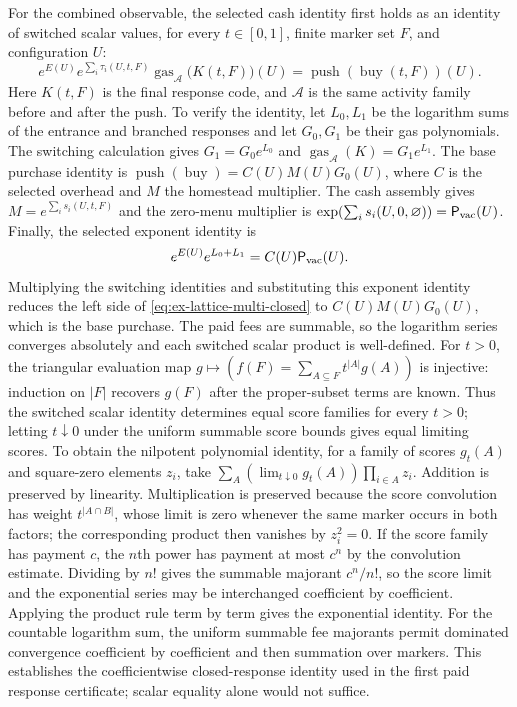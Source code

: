 For the combined observable, the selected cash identity first holds as an
identity of switched scalar values, for every $t\in[0,1]$, finite marker
set $F$, and configuration $U$:
\begin{equation}
 e^{E(U)}e^{\sum_i\tau_i(U,t,F)}
 \operatorname{gas}_{\mathcal A}\bigl(K(t,F)\bigr)(U)
 =\operatorname{push}(\operatorname{buy}(t,F))(U).
 \label{eq:ex-lattice-multi-closed}
\end{equation}
Here $K(t,F)$ is the final response code, and $\mathcal A$ is the same
activity family before and after the push. To verify the identity, let
$L_0,L_1$ be the logarithm sums of the entrance and branched responses and
let $G_0,G_1$ be their gas polynomials. The switching calculation gives
$G_1=G_0e^{L_0}$ and
$\operatorname{gas}_{\mathcal A}(K)=G_1e^{L_1}$. The base purchase identity
is $\operatorname{push}(\operatorname{buy})=C(U)M(U)G_0(U)$, where $C$
is the selected overhead and $M$ the homestead multiplier. The cash
assembly gives $M=e^{\sum_i s_i(U,t,F)}$ and the zero-menu multiplier is
$\exp(\sum_i s_i(U,0,\varnothing))=\mathsf P_{\rm vac}(U)$. Finally, the selected exponent identity is
\[
 e^{E(U)}e^{L_0+L_1}=C(U)\mathsf P_{\rm vac}(U).
\]
Multiplying the switching identities and substituting this exponent identity
reduces the left side of \eqref{eq:ex-lattice-multi-closed} to
$C(U)M(U)G_0(U)$, which is the base purchase. The paid fees are summable,
so the logarithm series converges absolutely and each switched scalar product
is well-defined. For $t>0$, the triangular evaluation map
$g\mapsto(f(F)=\sum_{A\subseteq F}t^{|A|}g(A))$ is injective: induction
on $|F|$ recovers $g(F)$ after the proper-subset terms are known. Thus the
switched scalar identity determines equal score families for every $t>0$;
letting $t\downarrow0$ under the uniform summable score bounds gives equal
limiting scores. To obtain the nilpotent polynomial identity, for a family
of scores $g_t(A)$ and square-zero elements $z_i$, take
$\sum_A(\lim_{t\downarrow0}g_t(A))\prod_{i\in A}z_i$. Addition is
preserved by linearity. Multiplication is preserved because the score
convolution has weight $t^{|A\cap B|}$, whose limit is zero whenever the
same marker occurs in both factors; the corresponding product then vanishes
by $z_i^2=0$. If the score family has payment $c$, the $n$th power has
payment at most $c^n$ by the convolution estimate. Dividing by $n!$
gives the summable majorant $c^n/n!$, so the score limit and the exponential
series may be interchanged coefficient by coefficient. Applying the product
rule term by term gives the exponential identity. For the countable logarithm sum, the uniform summable fee
majorants permit dominated convergence coefficient by coefficient and then
summation over markers. This establishes the coefficientwise closed-response
identity used in the first paid response certificate; scalar equality alone
would not suffice.

